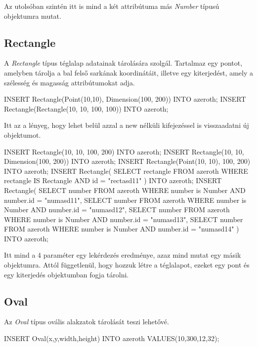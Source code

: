 Az utolsóban szintén itt is mind a két attribútuma más \textit{Number} típusú objektumra mutat.

\subsection{Rectangle}

A \textit{Rectangle} típus téglalap adatainak tárolására szolgál. Tartalmaz egy pontot, amelyben tárolja a bal felső sarkának koordinátáit, illetve egy kiterjedést, amely a szélesség és magasság attribútumokat adja.

\begin{sql}
INSERT Rectangle(Point(10,10), Dimension(100, 200)) INTO azeroth;
INSERT Rectangle(Rectangle(10, 10, 100, 100)) INTO azeroth;
\end{sql}

Itt az a lényeg, hogy lehet belül azzal a new nélküli kifejezéssel is visszaadatni új objektumot.

\begin{sql}
INSERT Rectangle(10, 10, 100, 200) INTO azeroth;
INSERT Rectangle(10, 10, Dimension(100, 200)) INTO azeroth;
INSERT Rectangle(Point(10, 10), 100, 200) INTO azeroth;
INSERT Rectangle(
    SELECT rectangle FROM azeroth
    WHERE rectangle IS Rectangle AND id = "rectasd11"
) INTO azeroth;
INSERT Rectangle(
    SELECT number FROM azeroth
    WHERE number is Number AND number.id = "numasd11",
    SELECT number FROM azeroth
    WHERE number is Number AND number.id = "numasd12",
    SELECT number FROM azeroth
    WHERE number is Number AND number.id = "numasd13",
    SELECT number FROM azeroth
    WHERE number is Number AND number.id = "numasd14"
) INTO azeroth;
\end{sql}

Itt mind a 4 paraméter egy lekérdezés eredménye, azaz mind mutat egy másik objektumra.
Attól függetlenül, hogy hozzuk létre a téglalapot, ezeket egy pont és egy kiterjedés objektumban fogja tárolni.

\subsection{Oval}

Az \textit{Oval} típus ovális alakzatok tárolását teszi lehetővé. 

\begin{sql}
INSERT Oval(x,y,width,height) INTO azeroth 
VALUES(10,300,12,32);
\end{sql}

